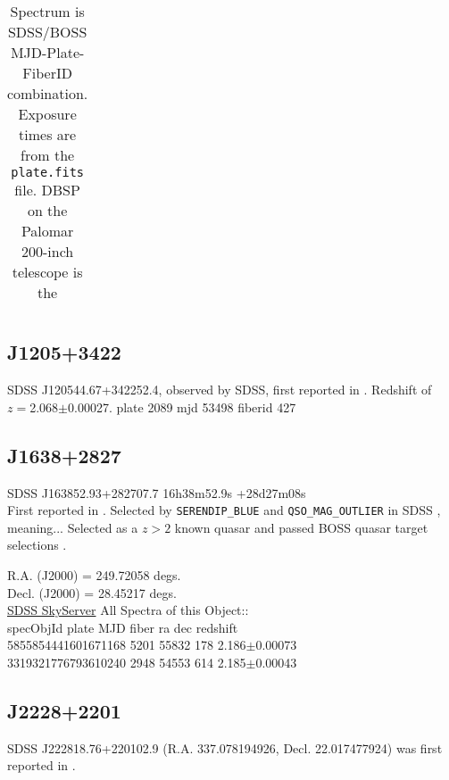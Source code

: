 \documentclass[a4paper,fleqn,usenatbib]{mnras}
\begin{document}
\begin{table*}
\begin{tabular}{r  r  r r r   r r r r}
   \hline \hline   
  \end{tabular}
  \caption{Spectrum is SDSS/BOSS MJD-Plate-FiberID combination. 
Exposure times are from the {\tt plate.fits} file. 
DBSP on the Palomar 200-inch telescope is the } 
 \label{tab:obs_notes}
\end{table*}


\subsection{J1205+3422 }
SDSS J120544.67+342252.4, observed by SDSS, first reported in \citet{Schneider2007}. 
Redshift of $z=$2.068$\pm$0.00027. 
plate	2089 
mjd	53498
fiberid	427


\subsection{J1638+2827}
SDSS J163852.93+282707.7       16h38m52.9s +28d27m08s  \\
First reported in \citet{Schneider2010}. 
Selected by {\tt SERENDIP\_BLUE} and {\tt QSO\_MAG\_OUTLIER} in SDSS \citep{Richards2002}, meaning...
Selected as a $z>2$ known quasar and passed BOSS quasar target selections \citep{Ross2012}. 


R.A. (J2000) = 249.72058 degs. \\
Decl. (J2000) = 28.45217 degs. \\
\href{skyserver.sdss.org/dr15/en/tools/explore/Summary.aspx?id=1237662301375824232}{SDSS SkyServer} 
All Spectra of this Object:: \\
specObjId	plate	MJD	fiber	ra	dec	redshift \\
5855854441601671168	5201	55832	178	2.186$\pm$0.00073\\
3319321776793610240	2948	54553	614	2.185$\pm$0.00043\\


\subsection{J2228+2201}
SDSS J222818.76+220102.9 (R.A. 337.078194926, Decl. 22.017477924) was first reported in 
\citet{Paris2017}. 
\end{document}
